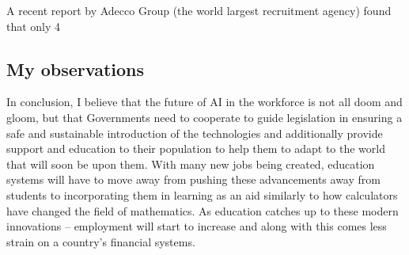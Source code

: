 A recent report by Adecco Group (the world largest recruitment agency) found that only 4%

\subsection{My observations}
In conclusion, I believe that the future of AI in the workforce is not all doom and gloom, but that Governments need to cooperate to guide legislation in ensuring a safe and sustainable introduction of the technologies and additionally provide support and education to their population to help them to adapt to the world that will soon be upon them. With many new jobs being created, education systems will have to move away from pushing these advancements away from students to incorporating them in learning as an aid similarly to how calculators have changed the field of mathematics. As education catches up to these modern innovations – employment will start to increase and along with this comes less strain on a country’s financial systems.
\fussy
